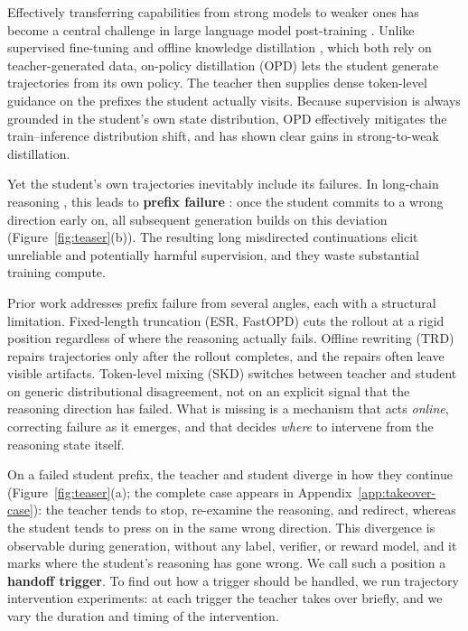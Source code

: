 \documentclass{article} %
\begin{document}
Effectively transferring capabilities from strong models to weaker ones has become a central challenge in large language model post-training \citep{yang2025qwen3,xu2026deepseek,zeng2026glm,xiao2026mimo}. Unlike supervised fine-tuning and offline knowledge distillation \citep{hinton2015distilling,kim2016sequence}, which both rely on teacher-generated data, on-policy distillation (OPD) \citep{agarwal2024policy,lu2025onpolicydistillation} lets the student generate trajectories from its own policy. The teacher then supplies dense token-level guidance on the prefixes the student actually visits. Because supervision is always grounded in the student's own state distribution, OPD effectively mitigates the train--inference distribution shift, and has shown clear gains in strong-to-weak distillation.



Yet the student's own trajectories inevitably include its failures.
In long-chain reasoning \citep{jaech2024openai,guo2025deepseek}, this leads to \textbf{prefix failure} \citep{li2026rethinking,fu2026revisiting,xie2026position}: once the student commits to a wrong direction early on, all subsequent generation builds on this deviation (Figure~\ref{fig:teaser}(b)). The resulting long misdirected continuations elicit unreliable and potentially harmful supervision, and they waste substantial training compute.


Prior work addresses prefix failure from several angles, each with a structural limitation. Fixed-length truncation (ESR, FastOPD) \citep{ziheng2026less,zhang2026fast} cuts the rollout at a rigid position regardless of where the reasoning actually fails. Offline rewriting (TRD) \citep{jiang2026trajectory} repairs trajectories only after the rollout completes, and the repairs often leave visible artifacts. Token-level mixing (SKD) \citep{xu2025speculative} switches between teacher and student on generic distributional disagreement, not on an explicit signal that the reasoning direction has failed. What is missing is a mechanism that acts \emph{online}, correcting failure as it emerges, and that decides \emph{where} to intervene from the reasoning state itself.


On a failed student prefix, the teacher and student diverge in how they continue (Figure~\ref{fig:teaser}(a); the complete case appears in Appendix~\ref{app:takeover-case}): the teacher tends to stop, re-examine the reasoning, and redirect, whereas the student tends to press on in the same wrong direction. This divergence is observable during generation, without any label, verifier, or reward model, and it marks where the student's reasoning has gone wrong. We call such a position a \textbf{handoff trigger}.
To find out how a trigger should be handled, we run trajectory intervention experiments: at each trigger the teacher takes over briefly, and we vary the duration and timing of the intervention.
\end{document}
